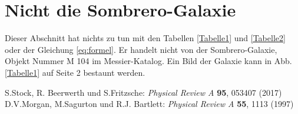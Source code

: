 \documentclass[a4paper, 10pt,onecolumn, captions=tableheading]{scrartcl}
\begin{document}
\section{Nicht die Sombrero-Galaxie}

Dieser Abschnitt hat nichts zu tun mit den Tabellen \ref{Tabelle1} und \ref{Tabelle2} oder der Gleichung \eqref{eq:formel}. Er handelt nicht von der Sombrero-Galaxie, Objekt Nummer M 104 im Messier-Katalog. Ein Bild der Galaxie kann in Abb. \ref{Tabelle1} auf Seite 2 bestaunt werden.
\newpage

\begin{thebibliography}{2}
	 S.Stock, R. Beerwerth und S.Fritzsche: 
		\emph{Physical Review A} \textbf{95}, 053407 (2017)
	 D.V.Morgan, M.Sagurton und R.J. Bartlett: \emph{Physical Review A} \textbf{55}, 1113 (1997)
\end{thebibliography}
\end{document}
